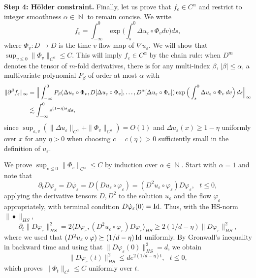 \documentclass{article}
\numberwithin{equation}{section}
\theoremstyle{definition}
\DeclareMathOperator{\N}{{\mathbb N}}
\providecommand{\eps}{\varepsilon}
\renewcommand{\phi}{\varphi}
\renewcommand{\cdot}{{\scriptstyle \bullet} }
\renewcommand{\le}{\leqslant}
\renewcommand{\ge}{\geqslant}
\begin{document}
{\bf Step 4: H\"older constraint.} Finally, let us prove that $f_\eps\in C^\alpha$ and restrict to integer smoothness $\alpha\in\N$ to remain concise. We write 
\[f_\eps = \int_{-\infty}^0\exp\Big(\int_s^0 \Delta u_\eps \circ \Phi_v  dv\Big ) ds, \]
where $\Phi_v:D\to D$ is the time-$v$ flow map of $\nabla u_\eps$. We will show that $\sup_{v\le 0} \|\Phi_v\|_{C^\alpha}\le C$. This will imply $f_\eps\in C^\alpha$ by the chain rule: when $D^m$ denotes the tensor of $m$-fold derivatives, there is for any multi-index $\beta$, $|\beta|\le \alpha$, a multivariate polynomial $P_\beta$ of order at most $\alpha$ with
\begin{align}
        \|  \partial^\beta  f_\eps \|_\infty &= \Big\|\int_{-\infty}^0 P_\beta(\Delta u_\eps \circ \Phi_v, D [ \Delta u_\eps \circ \Phi_v ],\dots,  D^\alpha [\Delta u_\eps \circ \Phi_v])\exp\Big(\int_s^0 \Delta u_\eps \circ \Phi_v  \,dv\Big ) \,ds\Big\|_\infty \notag\\
        &\lesssim    \int_{-\infty}^0 e^{(1-\eta)s} ds, \label{poly-display}
\end{align}
since $\sup_{\eps,v} ( \|\Delta u_\eps \|_{C^\alpha}+  \|\Phi_v\|_{C^\alpha} )= O(1) $ and $\Delta u_\eps(x)\ge 1-\eta$ uniformly over $x$ for any $\eta>0$ when choosing $c=c(\eta)>0$ sufficiently small in the definition of $u_\eps$. 


We prove $\sup_{v\le 0} \|\Phi_v\|_{C^\alpha}\le C$ by induction over $\alpha\in\N$. 
Start with $\alpha=1$ and note that 
\[ \partial_t D\phi_\eps = D\dot{\phi_\eps} = D(Du_\eps\circ \phi_\eps)= (D^2u_\eps \circ \phi_\eps) D\phi_\eps,~~~t\le 0, \]
applying the derivative tensors $D,D^2$ to the solution $u_\eps$ and the flow $\phi_\eps$ appropriately, with terminal condition $D\dot \phi_\eps(0) = \Id$. Thus, with the HS-norm $\|\cdot\|_{HS}$,
\[ \partial_t \| D\phi_\eps \|^2_{HS} = 2\langle  D\phi_\eps,(D^2u_\eps \circ \phi_\eps) D\phi_\eps\rangle_{HS}\ge 2 (1/d-\eta)\|D\phi_\eps\|^2_{HS},  \]
where we used that $(D^2u_\eps \circ \phi)\succeq (1/d-\eta) \Id$ uniformly. By Gronwall's inequality in backward time and using that $\|D\phi_\eps(0)\|_{HS}^2=d$, we obtain
\[ \| D\phi_\eps (t) \|^2_{HS} \le d e^{2(1/d-\eta)t}, ~~~t\le 0, \]
which proves  $\|\Phi_t\|_{C^1} \le C$ uniformly over $t$.
\end{document}
